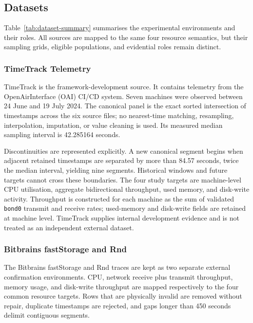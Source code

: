 \documentclass[a4paper,fleqn]{cas-dc}
\begin{document}
\subsection{Datasets}
\label{sec:datasets}

Table~\ref{tab:dataset-summary} summarises the experimental environments and
their roles.  All sources are mapped to the same four resource semantics, but
their sampling grids, eligible populations, and evidential roles remain
distinct.

\subsubsection{TimeTrack Telemetry}
\label{sec:timetrack-data}

TimeTrack is the framework-development source.  It contains telemetry from the
OpenAirInterface (OAI) CI/CD system.  Seven machines were observed between
24 June and 19 July 2024.  The canonical panel
is the exact sorted intersection of timestamps across the six source files; no
nearest-time matching, resampling, interpolation, imputation, or value cleaning
is used.  Its measured median sampling interval is 42.285164 seconds.

Discontinuities are represented explicitly.  A new canonical segment begins
when adjacent retained timestamps are separated by more than 84.57 seconds,
twice the median interval, yielding nine segments.  Historical windows and
future targets cannot cross these boundaries.  The four study targets are
machine-level CPU utilisation, aggregate bidirectional throughput, used memory,
and disk-write activity.  Throughput is constructed for each machine as the sum
of validated \texttt{bond0} transmit and receive rates; used-memory and
disk-write fields are retained at machine level.  TimeTrack supplies internal
development evidence and is not treated as an independent external dataset.

\subsubsection{Bitbrains fastStorage and Rnd}
\label{sec:bitbrains-data}

The Bitbrains fastStorage and Rnd traces are kept as two separate external
confirmation environments.  CPU,
network receive plus transmit throughput, memory usage, and disk-write
throughput are mapped respectively to the four common resource targets.  Rows
that are physically invalid are removed without repair, duplicate timestamps
are rejected, and gaps longer than 450 seconds delimit contiguous segments.
\end{document}
